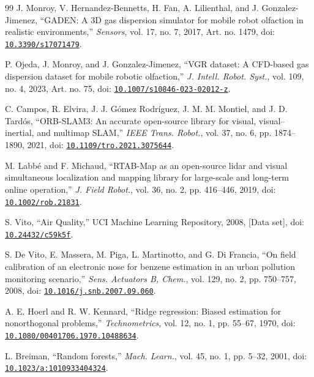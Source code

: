 \documentclass[11pt,a4paper]{article}
\begin{document}
\begin{thebibliography}{99}
J. Monroy, V. Hernandez-Bennetts, H. Fan, A. Lilienthal, and J. Gonzalez-Jimenez, “GADEN: A 3D gas dispersion simulator for mobile robot olfaction in realistic environments,” \textit{Sensors}, vol. 17, no. 7, 2017, Art. no. 1479, doi: \href{https://doi.org/10.3390/s17071479}{\nolinkurl{10.3390/s17071479}}.

P. Ojeda, J. Monroy, and J. Gonzalez-Jimenez, “VGR dataset: A CFD-based gas dispersion dataset for mobile robotic olfaction,” \textit{J. Intell. Robot. Syst.}, vol. 109, no. 4, 2023, Art. no. 75, doi: \href{https://doi.org/10.1007/s10846-023-02012-z}{\nolinkurl{10.1007/s10846-023-02012-z}}.

C. Campos, R. Elvira, J. J. Gómez Rodríguez, J. M. M. Montiel, and J. D. Tardós, “ORB-SLAM3: An accurate open-source library for visual, visual--inertial, and multimap SLAM,” \textit{IEEE Trans. Robot.}, vol. 37, no. 6, pp. 1874--1890, 2021, doi: \href{https://doi.org/10.1109/tro.2021.3075644}{\nolinkurl{10.1109/tro.2021.3075644}}.

M. Labbé and F. Michaud, “RTAB-Map as an open-source lidar and visual simultaneous localization and mapping library for large-scale and long-term online operation,” \textit{J. Field Robot.}, vol. 36, no. 2, pp. 416--446, 2019, doi: \href{https://doi.org/10.1002/rob.21831}{\nolinkurl{10.1002/rob.21831}}.

S. Vito, “Air Quality,” UCI Machine Learning Repository, 2008, [Data set], doi: \href{https://doi.org/10.24432/c59k5f}{\nolinkurl{10.24432/c59k5f}}.

S. De Vito, E. Massera, M. Piga, L. Martinotto, and G. Di Francia, “On field calibration of an electronic nose for benzene estimation in an urban pollution monitoring scenario,” \textit{Sens. Actuators B, Chem.}, vol. 129, no. 2, pp. 750--757, 2008, doi: \href{https://doi.org/10.1016/j.snb.2007.09.060}{\nolinkurl{10.1016/j.snb.2007.09.060}}.

A. E. Hoerl and R. W. Kennard, “Ridge regression: Biased estimation for nonorthogonal problems,” \textit{Technometrics}, vol. 12, no. 1, pp. 55--67, 1970, doi: \href{https://doi.org/10.1080/00401706.1970.10488634}{\nolinkurl{10.1080/00401706.1970.10488634}}.

L. Breiman, “Random forests,” \textit{Mach. Learn.}, vol. 45, no. 1, pp. 5--32, 2001, doi: \href{https://doi.org/10.1023/a:1010933404324}{\nolinkurl{10.1023/a:1010933404324}}.


\end{thebibliography}
\end{document}
